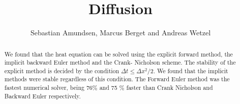 \documentclass{article}
\begin{document}
\title{Diffusion}
\author{Sebastian Amundsen, Marcus Berget and Andreas Wetzel}

\maketitle

\begin{abstract}

We found that the heat equation can be solved using the explicit forward method, the implicit backward Euler method and the Crank- Nicholson scheme. The stability of the explicit method is decided by the condition $\Delta t \leq \Delta x^2/2$. We found that the implicit methods were stable regardless of this condition. The Forward Euler method was the fastest numerical solver, being 76\% and 75 \% faster than Crank Nicholson and Backward Euler respectively. 

\end{abstract}
\end{document}
